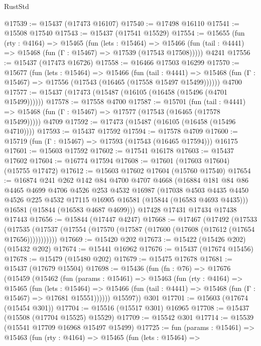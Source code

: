 \begin{lexlean}{RustStd}
\begin{coremodule}
@17539 := @15437 (@17473 @16107)
@17540 := @17498 @16110
@17541 := @15508 @17540
@17543 := @15437 (@17541 @15529)
@17554 := @15655
    (fun (rty : @4164) =>
    @15465
      (fun (lets : @15464) =>
      @15466 (fun (tail : @4441) => @15468 (fun (Γ : @15467) => @17539 (@17543 @17508)))))
    @4241
@17556 := @15437 (@17473 @16726)
@17558 := @16466 @17503 @16299
@17570 := @15677
    (fun (lets : @15464) =>
    @15466
      (fun (tail : @4441) =>
      @15468 (fun (Γ : @15467) => @17556 (@17543 (@16465 (@17558 @15497 @15499))))))
    @4700
@17577 := @15437 (@17473 (@15487 (@16105 (@16458 (@15496 (@4701 @15499))))))
@17578 := @17558 @4700
@17587 := @15701
    (fun (tail : @4441) => @15468 (fun (Γ : @15467) => @17577 (@17543 (@16465 (@17578 @15499)))))
    @4709
@17592 := @17473 (@15487 (@16105 (@16458 (@15496 @4710))))
@17593 := @15437 @17592
@17594 := @17578 @4709
@17600 := @15719 (fun (Γ : @15467) => @17593 (@17543 (@16465 @17594))) @16175
@17601 := @15603 @17592
@17602 := @17541 @16178
@17603 := @15437 @17602
@17604 := @16774 @17594
@17608 := @17601 (@17603 @17604) (@15755 @17472)
@17612 := @15603 @17602 @17604 (@15760 @17540)
@17654 := @16874
    @241
    @262
    @142
    @84
    @4700
    @4707
    @4668
    (@16884
      @181
      @84
      @86
      @4465
      @4699
      @4706
      @4526
      @253
      @4532
      @16987
      (@17038 @4503 @4435 @4450 @4526 @225 @4532 @17115 @16905 @16581 (@15844 (@16583 @4693 @4435)))
      @16581
      (@15844 (@16583 @4687 @4699)))
    @17428
    @17431
    @17434
    @17438
    @17443
@17656 := @15844 (@17447 @4247)
@17668 := @17467
    (@17492
      (@17533
        (@17535 (@17537 (@17554 (@17570 (@17587 (@17600 (@17608 (@17612 (@17654 @17656)))))))))))
@17669 := @15420 @202
@17673 := @15422 (@15426 @202) (@15432 @202)
@17674 := @15441 @16962
@17676 := @15437 (@17674 @15456)
@17678 := @15479 (@15480 @202)
@17679 := @15475 @17678
@17681 := @15437 (@17679 @15504)
@17698 := @15436
    (fun (fn : @76) =>
    @17676
      (@15459
        (@15462
          (fun (params : @15461) =>
          @15463
            (fun (rty : @4164) =>
            @15465
              (fun (lets : @15464) =>
              @15466 (fun (tail : @4441) => @15468 (fun (Γ : @15467) => @17681 @15551))))))
        @15597))
    @301
@17701 := @15603 (@17674 (@15454 @301))
@17704 := @15516 (@15517 @301) @16965
@17708 := @15437 (@15508 (@17704 @15525) @15529)
@17709 := @15542 @301
@17714 := @15539 (@15541 @17709 @16968 @15497 @15499)
@17725 := fun (params : @15461) =>
  @15463
    (fun (rty : @4164) =>
    @15465
      (fun (lets : @15464) =>

\end{coremodule}
\end{lexlean}

